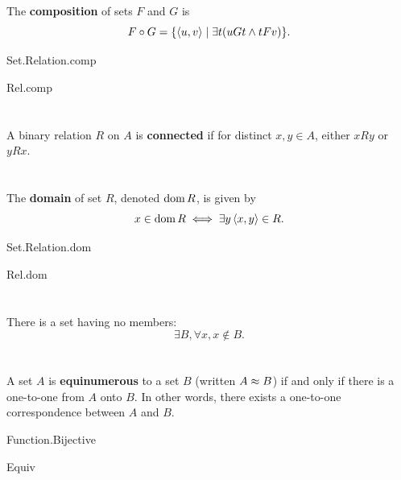 \documentclass{report}
\begin{document}
  The \textbf{composition} of sets $F$ and $G$ is
    $$F \circ G = \{\left< u, v \right> \mid \exists t(uGt \land tFv)\}.$$

    {Set.Relation.comp}

    {Rel.comp}

\section{}%

  A binary relation $R$ on $A$ is \textbf{connected} if for distinct
    $x, y \in A$, either $xRy$ or $yRx$.


\section{}%

  The \textbf{domain} of set $R$, denoted $\mathop{\text{dom}}{R}$, is given by
    $$x \in \mathop{\text{dom}}{R} \iff \exists y \left< x, y \right> \in R.$$

    {Set.Relation.dom}

    {Rel.dom}

\section{}%

  There is a set having no members: $$\exists B, \forall x, x \not\in B.$$


\section{}%

  A set $A$ is \textbf{equinumerous} to a set $B$ (written
    $A \approx B$) if and only if there is a one-to-one
     from $A$ onto $B$.
  In other words, there exists a one-to-one correspondence between $A$ and $B$.

    {Function.Bijective}

    {Equiv}
\end{document}
